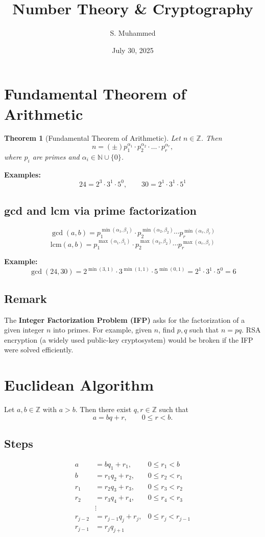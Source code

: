 \documentclass[hidelinks]{article}
\title{\textbf{\LARGE Number Theory \& Cryptography}}
\author{S. Muhammed}
\date{July 30, 2025}
\theoremstyle{mystyle}
\newtheorem{theorem}{Theorem}[section]
\begin{document}
\maketitle

\section{Fundamental Theorem of Arithmetic}

\begin{theorem}[Fundamental Theorem of Arithmetic]
Let $n \in \mathbb{Z}$. Then
\[
n = (\pm) p_1^{\alpha_1} \cdot p_2^{\alpha_2} \cdot \dots \cdot p_r^{\alpha_r},
\]
where $p_i$ are primes and $\alpha_i \in \mathbb{N} \cup \{0\}$.
\end{theorem}

\textbf{Examples:}
\[
24 = 2^3 \cdot 3^1 \cdot 5^0, \qquad 30 = 2^1 \cdot 3^1 \cdot 5^1
\]

\subsection{gcd and lcm via prime factorization}
\[
\gcd(a, b) = p_1^{\min(\alpha_1, \beta_1)} \cdot p_2^{\min(\alpha_2, \beta_2)} \cdots p_r^{\min(\alpha_r, \beta_r)}
\]
\[
\mathrm{lcm}(a, b) = p_1^{\max(\alpha_1, \beta_1)} \cdot p_2^{\max(\alpha_2, \beta_2)} \cdots p_r^{\max(\alpha_r, \beta_r)}
\]

\textbf{Example:}
\[
\gcd(24, 30) = 2^{\min(3,1)} \cdot 3^{\min(1,1)} \cdot 5^{\min(0,1)} = 2^1 \cdot 3^1 \cdot 5^0 = 6
\]

\subsection{Remark}
The \textbf{Integer Factorization Problem (IFP)} asks for the factorization of a given integer $n$ into primes.  
For example, given $n$, find $p,q$ such that $n=pq$.  
RSA encryption (a widely used public-key cryptosystem) would be broken if the IFP were solved efficiently.

\section{Euclidean Algorithm}

Let $a, b \in \mathbb{Z}$ with $a > b$. Then there exist $q, r \in \mathbb{Z}$ such that
\[
a = bq + r, \qquad 0 \leq r < b.
\]

\subsection{Steps}
\begin{align*}
a &= bq_1 + r_1, & 0 \le r_1 < b \\
b &= r_1 q_2 + r_2, & 0 \le r_2 < r_1 \\
r_1 &= r_2 q_3 + r_3, & 0 \le r_3 < r_2 \\
r_2 &= r_3 q_4 + r_4, & 0 \le r_4 < r_3 \\
&\vdots \\
r_{j-2} &= r_{j-1} q_j + r_j, & 0 \le r_j < r_{j-1} \\
r_{j-1} &= r_j q_{j+1} \\
\end{align*}
\end{document}
